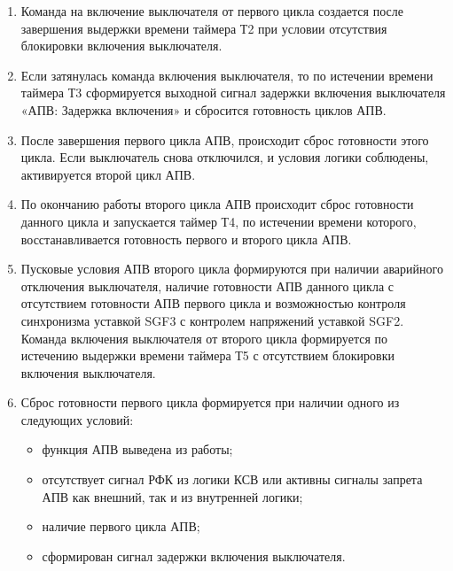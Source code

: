 \begin{enumerate}
\item
Команда на включение выключателя от первого цикла создается после завершения выдержки времени таймера Т2 при условии отсутствия блокировки включения выключателя.

\item
Если затянулась команда включения выключателя, то по истечении времени таймера Т3 сформируется выходной сигнал задержки включения выключателя «АПВ: Задержка включения» и сбросится готовность циклов АПВ.

\item
После завершения первого цикла АПВ, происходит сброс готовности этого цикла. Если выключатель снова отключился, и условия логики соблюдены, активируется второй цикл АПВ.

\item
По окончанию работы второго цикла АПВ происходит сброс готовности данного цикла и запускается таймер Т4, по истечении времени которого, восстанавливается готовность первого и второго цикла АПВ.

\item
Пусковые условия АПВ второго цикла формируются при наличии аварийного отключения выключателя, наличие готовности АПВ данного цикла с отсутствием готовности АПВ первого цикла и возможностью контроля синхронизма уставкой SGF3 с контролем напряжений уставкой SGF2. Команда включения выключателя от второго цикла формируется по истечению выдержки времени таймера Т5 с отсутствием блокировки включения выключателя.

\item
Сброс готовности первого цикла формируется при наличии одного из следующих условий:
\begin{itemize}
    \item функция АПВ выведена из работы;
    \item отсутствует сигнал РФК из логики КСВ или активны сигналы запрета АПВ как внешний, так и из внутренней логики;
    \item наличие первого цикла АПВ;
    \item сформирован сигнал задержки включения выключателя.
\end{itemize}


\end{enumerate}

